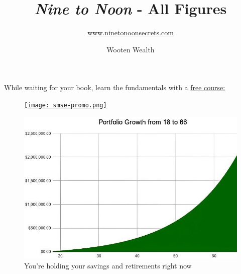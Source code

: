 \documentclass{article}
\title{\vspace{-.5cm}\textit{Nine to Noon} - All Figures}
\author{\href{https://www.ninetonoonsecrets.com}{www.ninetonoonsecrets.com}}
\date{Wooten Wealth}
\begin{document}
\maketitle
\thispagestyle{empty}


\begin{figure}[!htb]
    \centering
\end{figure}

\pagebreak
\thispagestyle{empty}
\begin{center}
\Large{While waiting for your book, learn the fundamentals with a \href{https://www.stockmarketsecrets.exposed}{free course:}}
\end{center}
\begin{figure}[!htb]
    \centering
    \href{https://www.stockmarketsecrets.exposed}{{\texttt{[image: smse-promo.png]}}}
\end{figure}
\pagebreak

\setcounter{page}{1}

\begin{figure}[!htb]
    \centering
    \includegraphics[width=\textwidth]{imgs/1.png}
    \caption{You're holding your savings and retirements right now}
\end{figure}





\vspace{10pt}
\end{document}
